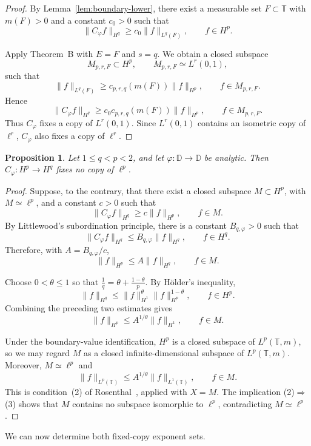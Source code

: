 \documentclass[11pt, reqno]{amsart}
\newtheorem{proposition}[theorem]{Proposition}
\theoremstyle{definition}
\theoremstyle{remark}
\newcommand{\D}{\mathbb{D}}
\newcommand{\T}{\mathbb{T}}
\begin{document}
\begin{proof}
By Lemma~\ref{lem:boundary-lower}, there exist a
measurable set \(F\subset\T\) with \(m(F)>0\) and a constant
\(c_0>0\) such that
\[
        \|C_\varphi f\|_{H^q}
        \ge
        c_0\|f\|_{L^q(F)},
        \qquad
        f\in H^p.
\]

Apply Theorem~B with \(E=F\) and \(s=q\). We obtain a closed subspace
\[
        M_{p,r,F}\subset H^p,
        \qquad
        M_{p,r,F}\simeq L^r(0,1),
\]
such that
\[
        \|f\|_{L^q(F)}
        \ge
        c_{p,r,q}(m(F))\|f\|_{H^p},
        \qquad
        f\in M_{p,r,F}.
\]
Hence
\[
        \|C_\varphi f\|_{H^q}
        \ge
        c_0c_{p,r,q}(m(F))\|f\|_{H^p},
        \qquad
        f\in M_{p,r,F}.
\]
Thus \(C_\varphi\) fixes a copy of \(L^r(0,1)\). Since
\(L^r(0,1)\) contains an isometric copy of \(\ell^r\),
\(C_\varphi\) also fixes a copy of \(\ell^r\).
\end{proof}

\begin{proposition}
\label{prop:ellp-singular}
Let \(1\le q<p<2\), and let \(\varphi:\D\to\D\) be analytic. Then
\(C_\varphi:H^p\to H^q\) fixes no copy of \(\ell^p\).
\end{proposition}

\begin{proof}
Suppose, to the contrary, that there exist a closed subspace
\(M\subset H^p\), with \(M\simeq\ell^p\), and a constant \(c>0\)
such that
\[
        \|C_\varphi f\|_{H^q}
        \ge
        c\|f\|_{H^p},
        \qquad
        f\in M.
\]
By Littlewood's subordination principle, there is a constant
\(B_{q,\varphi}>0\) such that
\[
        \|C_\varphi f\|_{H^q}
        \le
        B_{q,\varphi}\|f\|_{H^q},
        \qquad
        f\in H^q.
\]
Therefore, with \(A=B_{q,\varphi}/c\),
\[
        \|f\|_{H^p}
        \le
        A\|f\|_{H^q},
        \qquad
        f\in M.
\]

Choose \(0<\theta\leq 1\) so that
\(\frac1q=\theta+\frac{1-\theta}{p}\).
By H\"older's inequality,
\[
        \|f\|_{H^q}
        \le
        \|f\|_{H^1}^{\theta}
        \|f\|_{H^p}^{1-\theta},
        \qquad
        f\in H^p.
\]
Combining the preceding two estimates gives
\[
        \|f\|_{H^p}
        \le
        A^{1/\theta}\|f\|_{H^1},
        \qquad
        f\in M.
\]

Under the boundary-value identification,
\(H^p\) is a closed subspace of \(L^p(\T,m)\), so we may regard
\(M\) as a closed infinite-dimensional subspace of \(L^p(\T,m)\).
Moreover, \(M\simeq\ell^p\) and
\[
        \|f\|_{L^p(\T)}
        \le
        A^{1/\theta}\|f\|_{L^1(\T)},
        \qquad
        f\in M.
\]
This is condition~\textup{(2)} of
Rosenthal~\cite[Theorem~13, p.~370]{Rosenthal1973}, applied with
\(X=M\). 
The implication
\textup{(2)}\(\Rightarrow\)\textup{(3)} shows that \(M\) contains no
subspace isomorphic to \(\ell^p\), contradicting \(M\simeq\ell^p\).
\end{proof}
We can now determine both fixed-copy exponent sets.
\end{document}
